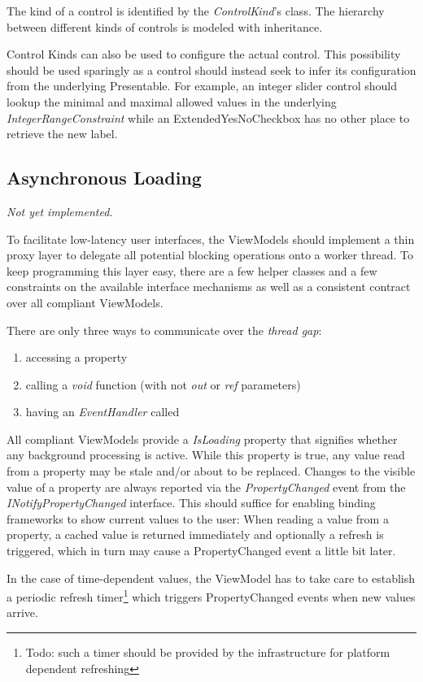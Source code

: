The kind of a control is identified by the \emph{ControlKind}'s class. The
hierarchy between different kinds of controls is modeled with inheritance.

Control Kinds can also be used to configure the actual control. This
possibility should be used sparingly as a control should instead seek to
infer its configuration from the underlying Presentable. For example, an
integer slider control should lookup the minimal and maximal allowed
values in the underlying \emph{IntegerRangeConstraint} while an
ExtendedYesNoCheckbox has no other place to retrieve the new label.

\subsection{Asynchronous Loading}

\emph{Not yet implemented.}

To facilitate low-latency user interfaces, the ViewModels should implement a
thin proxy layer to delegate all potential blocking operations onto a worker
thread. To keep programming this layer easy, there are a few helper classes and
a few constraints on the available interface mechanisms as well as a consistent
contract over all compliant ViewModels.

There are only three ways to communicate over the \emph{thread gap}:
\begin{enumerate}
\item{accessing a property}
\item{calling a \emph{void} function (with not \emph{out} or \emph{ref} parameters)}
\item{having an \emph{EventHandler} called}
\end{enumerate}

All compliant ViewModels provide a \emph{IsLoading} property that signifies
whether any background processing is active. While this property is true, any
value read from a property may be stale and/or about to be replaced. Changes to
the visible value of a property are always reported via the
\emph{PropertyChanged} event from the \emph{INotifyPropertyChanged} interface.
This should suffice for enabling binding frameworks to show current values to
the user: When reading a value from a property, a cached value is returned
immediately and optionally a refresh is triggered, which in turn may cause a
PropertyChanged event a little bit later.

In the case of time-dependent values, the ViewModel has to take care
to establish a periodic refresh timer\footnote{Todo: such a timer should be
provided by the infrastructure for platform dependent refreshing} which
triggers PropertyChanged events when new values arrive.

